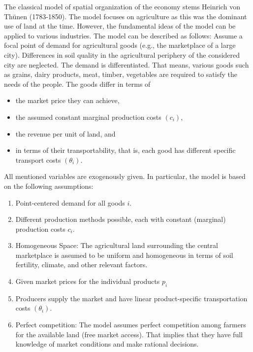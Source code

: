 \documentclass[
  12pt,
  oneside]{book}
\providecommand{\tightlist}{%
  \setlength{\itemsep}{0pt}\setlength{\parskip}{0pt}}
\theoremstyle{definition}
\theoremstyle{definition}
\theoremstyle{definition}
\theoremstyle{definition}
\theoremstyle{remark}
\begin{document}
The classical model of spatial organization of the economy stems Heinrich von Thünen (1783-1850). The model focuses on agriculture as this was the dominant use of land at the time. However, the fundamental ideas of the model can be applied to various industries.
The model can be described as follows: Assume a focal point of demand for agricultural goods (e.g., the marketplace of a large city). Differences in soil quality in the agricultural periphery of the considered city are neglected. The demand is differentiated. That means, various goods such as grains, dairy products, meat, timber, vegetables are required to satisfy the needs of the people. The goods differ in terms of

\begin{itemize}
\tightlist
\item
  the market price they can achieve,
\item
  the assumed constant marginal production costs \((c_i)\),
\item
  the revenue per unit of land, and
\item
  in terms of their transportability, that is, each good has different specific transport costs \((\theta_i)\).
\end{itemize}

All mentioned variables are exogenously given. In particular, the model is based on the following assumptions:

\begin{enumerate}
\def\labelenumi{\arabic{enumi}.}
\tightlist
\item
  Point-centered demand for all goods \(i\).
\item
  Different production methods possible, each with constant (marginal) production costs \(c_i\).
\item
  Homogeneous Space: The agricultural land surrounding the central marketplace is assumed to be uniform and homogeneous in terms of soil fertility, climate, and other relevant factors.
\item
  Given market prices for the individual products \(p_i\)
\item
  Producers supply the market and have linear product-specific transportation costs \((\theta_i)\).
\item
  Perfect competition: The model assumes perfect competition among farmers for the available land (free market access). That implies that they have full knowledge of market conditions and make rational decisions.
\end{enumerate}
\end{document}
